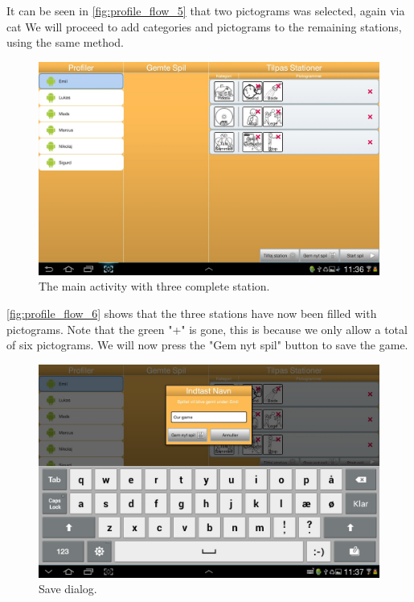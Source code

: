 It can be seen in \autoref{fig:profile_flow_5} that two pictograms was selected, again via \ac{cat} We will proceed to add categories and pictograms to the remaining stations, using the same method.

\begin{figure}[H]
\centering
\includegraphics[width=1.0\linewidth]{img/screenshots/profile_flow_6.jpg}%
\caption{The main activity with three complete station.}
\label{fig:profile_flow_6}
\end{figure}

\autoref{fig:profile_flow_6} shows that the three stations have now been filled with pictograms. Note that the green "+" is gone, this is because we only allow a total of six pictograms. We will now press the "Gem nyt spil" button to save the game.

\begin{figure}[H]
\centering
\includegraphics[width=1.0\linewidth]{img/screenshots/profile_flow_7.jpg}%
\caption{Save dialog.}
\label{fig:profile_flow_7}
\end{figure}

